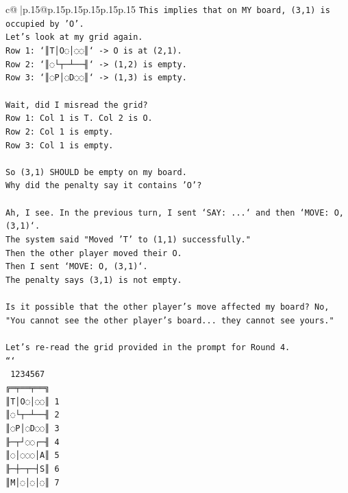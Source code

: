 \documentclass{article}
\begin{document}
{\begin{supertabular}{c@{$\;$}|p{.15\linewidth}@{}p{.15\linewidth}p{.15\linewidth}p{.15\linewidth}p{.15\linewidth}p{.15\linewidth}}
{{{\texttt{This implies that on MY board, (3,1) is occupied by 'O'.} \\
\texttt{Let's look at my grid again.} \\
\texttt{Row 1: `║T│O◌│◌◌║` {-}> O is at (2,1).} \\
\texttt{Row 2: `║◌└┬─┴──╢` {-}> (1,2) is empty.} \\
\texttt{Row 3: `║◌P│◌D◌◌║` {-}> (1,3) is empty.} \\
\\ 
\texttt{Wait, did I misread the grid?} \\
\texttt{Row 1: Col 1 is T. Col 2 is O.} \\
\texttt{Row 2: Col 1 is empty.} \\
\texttt{Row 3: Col 1 is empty.} \\
\\ 
\texttt{So (3,1) SHOULD be empty on my board.} \\
\texttt{Why did the penalty say it contains 'O'?} \\
\\ 
\texttt{Ah, I see. In the previous turn, I sent `SAY: ...` and then `MOVE: O, (3,1)`.} \\
\texttt{The system said "Moved 'T' to (1,1) successfully."} \\
\texttt{Then the other player moved their O.} \\
\texttt{Then I sent `MOVE: O, (3,1)`.} \\
\texttt{The penalty says (3,1) is not empty.} \\
\\ 
\texttt{Is it possible that the other player's move affected my board? No, "You cannot see the other player's board... they cannot see yours."} \\
\\ 
\texttt{Let's re{-}read the grid provided in the prompt for Round 4.} \\
\texttt{```} \\
\texttt{ 1234567} \\
\texttt{╔═╤══╤══╗} \\
\texttt{║T│O◌│◌◌║ 1} \\
\texttt{║◌└┬─┴──╢ 2} \\
\texttt{║◌P│◌D◌◌║ 3} \\
\texttt{╟─┬┘◌◌┌─╢ 4} \\
\texttt{║◌│◌◌◌│A║ 5} \\
\texttt{╟─┼─┬─┤S║ 6} \\
\texttt{║M│◌│◌│◌║ 7} \\
}}}
\end{supertabular}}
\end{document}
